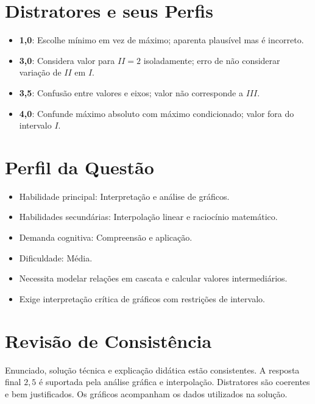 \documentclass{article}
\begin{document}
\section{Distratores e seus Perfis}
\begin{itemize}
\item \textbf{1,0}: Escolhe mínimo em vez de máximo; aparenta plausível mas é incorreto.
\item \textbf{3,0}: Considera valor para \(II=2\) isoladamente; erro de não considerar variação de \(II\) em \(I\).
\item \textbf{3,5}: Confusão entre valores e eixos; valor não corresponde a \(III\).
\item \textbf{4,0}: Confunde máximo absoluto com máximo condicionado; valor fora do intervalo \(I\).
\end{itemize}

\section{Perfil da Questão}
\begin{itemize}
\item Habilidade principal: Interpretação e análise de gráficos.
\item Habilidades secundárias: Interpolação linear e raciocínio matemático.
\item Demanda cognitiva: Compreensão e aplicação.
\item Dificuldade: Média.
\item Necessita modelar relações em cascata e calcular valores intermediários.
\item Exige interpretação crítica de gráficos com restrições de intervalo.
\end{itemize}

\section{Revisão de Consistência}
Enunciado, solução técnica e explicação didática estão consistentes. A resposta final \(2,5\) é suportada pela análise gráfica e interpolação. Distratores são coerentes e bem justificados. Os gráficos acompanham os dados utilizados na solução.
\end{document}
